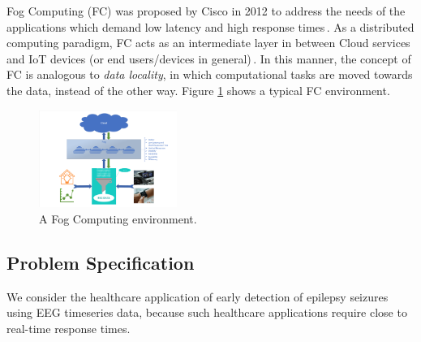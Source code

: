 \documentclass[letterpaper]{article}
\begin{document}
Fog Computing (FC) was proposed by Cisco in 2012 to address the needs of the applications which demand low latency and high response times\,\cite{cisco2012}. As a distributed computing paradigm, FC acts as an intermediate layer in between Cloud services and IoT devices (or end users/devices in general)\,\cite{Mahmud2018}. In this manner, the concept of FC is analogous to \emph{data locality}, in which computational tasks are moved towards the data, instead of the other way. Figure \ref{fig-fog-computing} shows a typical FC environment.


\begin{figure}
    \label{fig-fog-computing}
    \centering
        \includegraphics[width=0.4\textwidth]{figs/Data_Stream_Processing_in_Fog_Computing.pdf}
    \caption{A Fog Computing environment.}
  \end{figure}


\subsection{Problem Specification}
We consider the healthcare application of early detection of epilepsy seizures using EEG timeseries data, because such healthcare applications require close to real-time response times.
\end{document}
